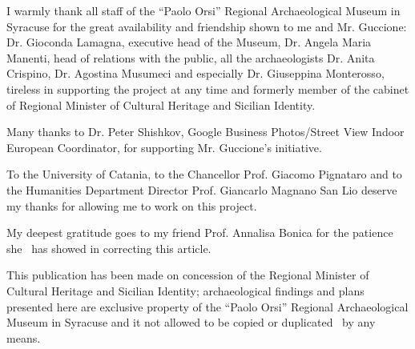 \documentclass[amsthm,ebook]{saparticle}
\begin{document}
I warmly thank all staff of the “Paolo Orsi” Regional Archaeological Museum in Syracuse for the great availability and
friendship shown to me and Mr. Guccione: Dr. Gioconda Lamagna, executive head of the Museum, Dr. Angela Maria Manenti,
head of relations with the public, all the archaeologists Dr. Anita Crispino, Dr. Agostina Musumeci and especially Dr.
Giuseppina Monterosso, tireless in supporting the project at any time and formerly member of the cabinet of Regional
Minister of Cultural Heritage and Sicilian Identity.

Many thanks to Dr. Peter Shishkov, Google Business Photos/Street View Indoor European Coordinator, for supporting Mr.
Guccione’s initiative.

To the University of Catania, to the Chancellor Prof. Giacomo Pignataro and to the Humanities Department Director Prof.
Giancarlo Magnano San Lio deserve my thanks for allowing me to work on this project.

My deepest gratitude goes to my friend Prof. Annalisa Bonica for the patience she \ has showed in correcting this
article.

This publication has been made on concession of the Regional Minister of Cultural Heritage and Sicilian Identity;
archaeological findings and plans presented here are exclusive property of the “Paolo Orsi” Regional Archaeological
Museum in Syracuse and it not allowed to be copied or duplicated \ by any means.



\end{document}
